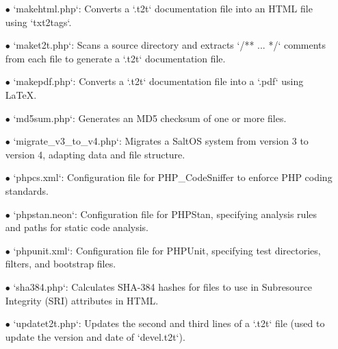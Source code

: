 \documentclass[a4paper]{article}
\begin{document}
\begin{itemize}
\item[\color{myblue}$\bullet$] `makehtml.php`: Converts a `.t2t` documentation file into an HTML file using `txt2tags`.
\item[\color{myblue}$\bullet$] `maket2t.php`: Scans a source directory and extracts `/** ... */` comments from each file to generate a `.t2t` documentation file.
\item[\color{myblue}$\bullet$] `makepdf.php`: Converts a `.t2t` documentation file into a `.pdf` using LaTeX.
\item[\color{myblue}$\bullet$] `md5sum.php`: Generates an MD5 checksum of one or more files.
\item[\color{myblue}$\bullet$] `migrate\_v3\_to\_v4.php`: Migrates a SaltOS system from version 3 to version 4, adapting data and file structure.
\item[\color{myblue}$\bullet$] `phpcs.xml`: Configuration file for PHP\_CodeSniffer to enforce PHP coding standards.
\item[\color{myblue}$\bullet$] `phpstan.neon`: Configuration file for PHPStan, specifying analysis rules and paths for static code analysis.
\item[\color{myblue}$\bullet$] `phpunit.xml`: Configuration file for PHPUnit, specifying test directories, filters, and bootstrap files.
\item[\color{myblue}$\bullet$] `sha384.php`: Calculates SHA-384 hashes for files to use in Subresource Integrity (SRI) attributes in HTML.
\item[\color{myblue}$\bullet$] `updatet2t.php`: Updates the second and third lines of a `.t2t` file (used to update the version and date of `devel.t2t`).

\end{itemize}

\end{document}
